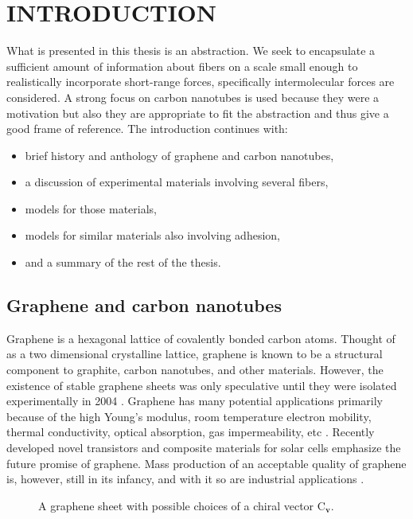\chapter{INTRODUCTION} \label{chap:one}
	What is presented in this thesis is an abstraction. We seek to encapsulate a sufficient amount of information about fibers on a scale small enough to realistically incorporate short-range forces, specifically intermolecular forces are considered. A strong focus on carbon nanotubes is used because they were a motivation but also they are appropriate to fit the abstraction and thus give a good frame of reference. The introduction continues with:

\begin{itemize}	
	\item {
		brief history and anthology of graphene and carbon nanotubes, 
	}
	\item {
		a discussion of experimental materials involving several fibers,
	}
	\item {
		models for those materials,
	}
	\item {
		models for similar materials also involving adhesion,
	}
	\item {
		and a summary of the rest of the thesis.
	}
\end{itemize}



\section{Graphene and carbon nanotubes}
	
	Graphene is a hexagonal lattice of covalently bonded carbon atoms. Thought of as a two dimensional crystalline lattice, graphene is known to be a structural component to graphite, carbon nanotubes, and other materials. However, the existence of stable graphene sheets was only speculative until they were isolated experimentally in 2004 \cite{Novoselov2004}. Graphene has many potential applications primarily because of the high Young's modulus, room temperature electron mobility, thermal conductivity, optical absorption, gas impermeability, etc \cite{Novoselov2012}. Recently developed novel transistors \cite{Lin2010} and composite materials for solar cells \cite{Wang2013} emphasize the future promise of graphene. Mass production of an acceptable quality of graphene is, however, still in its infancy, and with it so are industrial applications \cite{Novoselov2012}.
	
	\begin{figure}
		\begin{center}
			\def\svgwidth{.75\columnwidth}
			
		\end{center}		
		\caption{A graphene sheet with possible choices of a chiral vector $\mbox{C}_{\textbf{v}}$.
		\label{fig:GrapheneCat}}
	\end{figure}	
	
